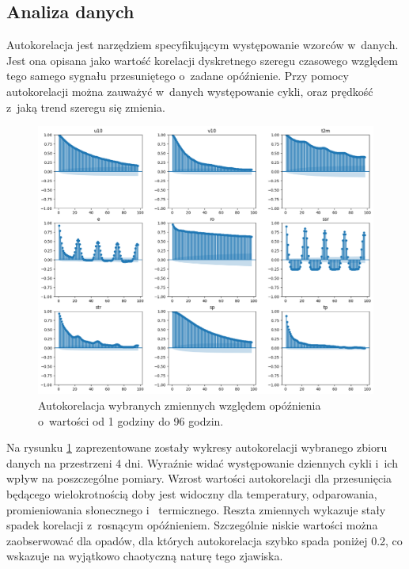 \subsection{Analiza danych}

Autokorelacja jest narzędziem specyfikującym występowanie wzorców w~danych. Jest ona 
opisana jako wartość korelacji dyskretnego szeregu czasowego względem tego samego sygnału
przesuniętego o~zadane opóźnienie. Przy pomocy autokorelacji można zauważyć w~danych
występowanie cykli, oraz prędkość z~jaką trend szeregu się zmienia.

\begin{figure}[H]
    \centering
    \includegraphics[width=\textwidth]{images/autocorrelation.png}
    \caption{Autokorelacja wybranych zmiennych względem opóźnienia o~wartości od 
    1 godziny do 96 godzin.}
    \label{autocorrelation}
\end{figure}

Na rysunku \ref{autocorrelation} zaprezentowane zostały wykresy autokorelacji wybranego
zbioru danych na przestrzeni 4 dni. Wyraźnie widać występowanie dziennych cykli i~ich wpływ
na poszczególne pomiary. Wzrost wartości autokorelacji dla przesunięcia będącego
wielokrotnością doby jest widoczny dla temperatury, odparowania, promieniowania słonecznego i~
termicznego. Reszta zmiennych wykazuje stały spadek korelacji z~rosnącym opóźnieniem. 
Szczególnie niskie wartości można zaobserwować dla opadów, dla których autokorelacja szybko spada
poniżej 0.2, co wskazuje na wyjątkowo chaotyczną naturę tego zjawiska.

